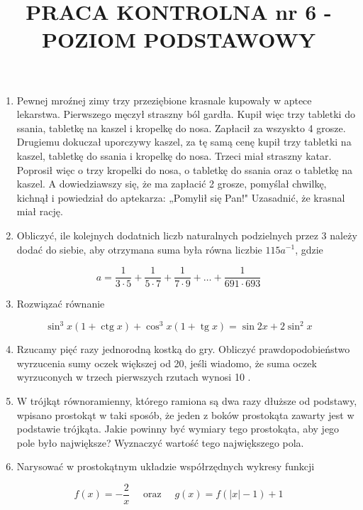 \documentclass[10pt]{article}
\title{PRACA KONTROLNA nr 6 - POZIOM PODSTAWOWY }
\author{}
\date{}
\begin{document}
\maketitle
\begin{enumerate}
  \item Pewnej mroźnej zimy trzy przeziębione krasnale kupowały w aptece lekarstwa. Pierwszego męczył straszny ból gardła. Kupił więc trzy tabletki do ssania, tabletkę na kaszel i kropelkę do nosa. Zapłacił za wszyskto 4 grosze. Drugiemu dokuczał uporczywy kaszel, za tę samą cenę kupił trzy tabletki na kaszel, tabletkę do ssania i kropelkę do nosa. Trzeci miał straszny katar. Poprosił więc o trzy kropelki do nosa, o tabletkę do ssania oraz o tabletkę na kaszel. A dowiedziawszy się, że ma zapłacić 2 grosze, pomyślał chwilkę, kichnął i powiedział do aptekarza: „Pomylił się Pan!" Uzasadnić, że krasnal miał rację.
  \item Obliczyć, ile kolejnych dodatnich liczb naturalnych podzielnych przez 3 należy dodać do siebie, aby otrzymana suma była równa liczbie $115 a^{-1}$, gdzie
\end{enumerate}

$$
a=\frac{1}{3 \cdot 5}+\frac{1}{5 \cdot 7}+\frac{1}{7 \cdot 9}+\ldots+\frac{1}{691 \cdot 693}
$$

\begin{enumerate}
  \setcounter{enumi}{2}
  \item Rozwiązać równanie
\end{enumerate}

$$
\sin ^{3} x(1+\operatorname{ctg} x)+\cos ^{3} x(1+\operatorname{tg} x)=\sin 2 x+2 \sin ^{2} x
$$

\begin{enumerate}
  \setcounter{enumi}{3}
  \item Rzucamy pięć razy jednorodną kostką do gry. Obliczyć prawdopodobieństwo wyrzucenia sumy oczek większej od 20, jeśli wiadomo, że suma oczek wyrzuconych w trzech pierwszych rzutach wynosi 10 .
  \item W trójkąt równoramienny, którego ramiona są dwa razy dłuższe od podstawy, wpisano prostokąt w taki sposób, że jeden z boków prostokąta zawarty jest w podstawie trójkąta. Jakie powinny być wymiary tego prostokąta, aby jego pole było największe? Wyznaczyć wartość tego największego pola.
  \item Narysować w prostokątnym układzie współrzędnych wykresy funkcji
\end{enumerate}

$$
f(x)=-\frac{2}{x} \quad \text { oraz } \quad g(x)=f(|x|-1)+1
$$
\end{document}
